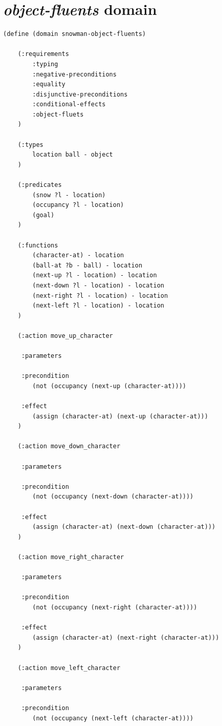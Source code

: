 \documentclass{report}
\theoremstyle{plain}
\begin{document}
\newpage

\section{\emph{object-fluents} domain}
\label{annex:pddl-object-fluents}
\begin{lstlisting}
(define (domain snowman-object-fluents)
    
    (:requirements 
        :typing
        :negative-preconditions
        :equality
        :disjunctive-preconditions
        :conditional-effects
        :object-fluets
    )

    (:types 
        location ball - object
    )

    (:predicates
        (snow ?l - location)
        (occupancy ?l - location)
        (goal)
    )
    
    (:functions
        (character-at) - location
        (ball-at ?b - ball) - location
        (next-up ?l - location) - location
        (next-down ?l - location) - location
        (next-right ?l - location) - location
        (next-left ?l - location) - location
    )
    
    (:action move_up_character
        
     :parameters
        
     :precondition
        (not (occupancy (next-up (character-at))))

     :effect
        (assign (character-at) (next-up (character-at)))
    )

    (:action move_down_character
        
     :parameters
        
     :precondition
        (not (occupancy (next-down (character-at))))
        
     :effect
        (assign (character-at) (next-down (character-at)))
    )

    (:action move_right_character
        
     :parameters
        
     :precondition
        (not (occupancy (next-right (character-at))))
        
     :effect
        (assign (character-at) (next-right (character-at)))
    )

    (:action move_left_character
        
     :parameters
        
     :precondition
        (not (occupancy (next-left (character-at))))
        

\end{lstlisting}
\end{document}
